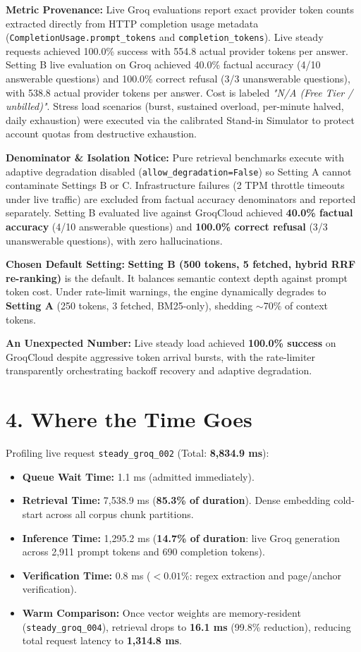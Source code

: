 \documentclass[9pt,twocolumn]{article}
\begin{document}
\textbf{Metric Provenance:} Live Groq evaluations report exact provider token counts extracted directly from HTTP completion usage metadata (\texttt{CompletionUsage.prompt\_tokens} and \texttt{completion\_tokens}). Live steady requests achieved 100.0\% success with 554.8 actual provider tokens per answer. Setting B live evaluation on Groq achieved 40.0\% factual accuracy (4/10 answerable questions) and 100.0\% correct refusal (3/3 unanswerable questions), with 538.8 actual provider tokens per answer. Cost is labeled \textit{"N/A (Free Tier / unbilled)"}. Stress load scenarios (burst, sustained overload, per-minute halved, daily exhaustion) were executed via the calibrated Stand-in Simulator to protect account quotas from destructive exhaustion.

\textbf{Denominator \& Isolation Notice:} Pure retrieval benchmarks execute with adaptive degradation disabled (\texttt{allow\_degradation=False}) so Setting A cannot contaminate Settings B or C. Infrastructure failures (2 TPM throttle timeouts under live traffic) are excluded from factual accuracy denominators and reported separately. Setting B evaluated live against GroqCloud achieved \textbf{40.0\% factual accuracy} (4/10 answerable questions) and \textbf{100.0\% correct refusal} (3/3 unanswerable questions), with zero hallucinations.

\textbf{Chosen Default Setting:} \textbf{Setting B (500 tokens, 5 fetched, hybrid RRF re-ranking)} is the default. It balances semantic context depth against prompt token cost. Under rate-limit warnings, the engine dynamically degrades to \textbf{Setting A} (250 tokens, 3 fetched, BM25-only), shedding $\sim$70\% of context tokens.

\textbf{An Unexpected Number:} Live steady load achieved \textbf{100.0\% success} on GroqCloud despite aggressive token arrival bursts, with the rate-limiter transparently orchestrating backoff recovery and adaptive degradation.

\section{4. Where the Time Goes}
Profiling live request \texttt{steady\_groq\_002} (Total: \textbf{8,834.9 ms}):
\begin{itemize}
    \setlength{\itemsep}{0pt}\setlength{\parskip}{0pt}
    \item \textbf{Queue Wait Time:} 1.1 ms (admitted immediately).
    \item \textbf{Retrieval Time:} 7,538.9 ms (\textbf{85.3\% of duration}). Dense embedding cold-start across all corpus chunk partitions.
    \item \textbf{Inference Time:} 1,295.2 ms (\textbf{14.7\% of duration}: live Groq generation across 2,911 prompt tokens and 690 completion tokens).
    \item \textbf{Verification Time:} 0.8 ms ($<0.01\%$: regex extraction and page/anchor verification).
    \item \textbf{Warm Comparison:} Once vector weights are memory-resident (\texttt{steady\_groq\_004}), retrieval drops to \textbf{16.1 ms} (99.8\% reduction), reducing total request latency to \textbf{1,314.8 ms}.
\end{itemize}
\end{document}

